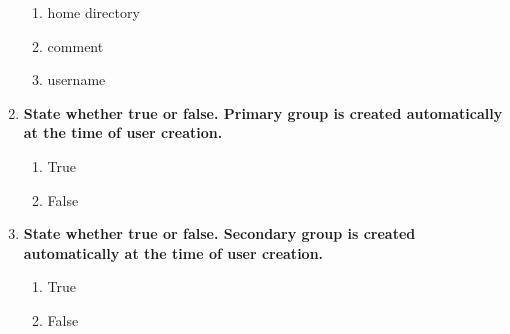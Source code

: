 \begin{flushleft}
\begin{enumerate}
\begin{enumerate}[label=(\alph*)]
			\item home directory        %
			\item comment	%
			\item username	%
		\end{enumerate}
		\bigskip
		\bigskip
		\item \textbf{State whether true or false. Primary group is created automatically at the time of user creation.}
		\begin{enumerate}[label=(\alph*)]
			\item True       %
			\item False
		\end{enumerate}
		\bigskip
		\bigskip
		\item \textbf{State whether true or false. Secondary group is created automatically at the time of user creation.}
		\begin{enumerate}[label=(\alph*)]
			\item True       
			\item False  %
		\end{enumerate}
	\end{enumerate}
	
	
\end{flushleft}
\newpage


